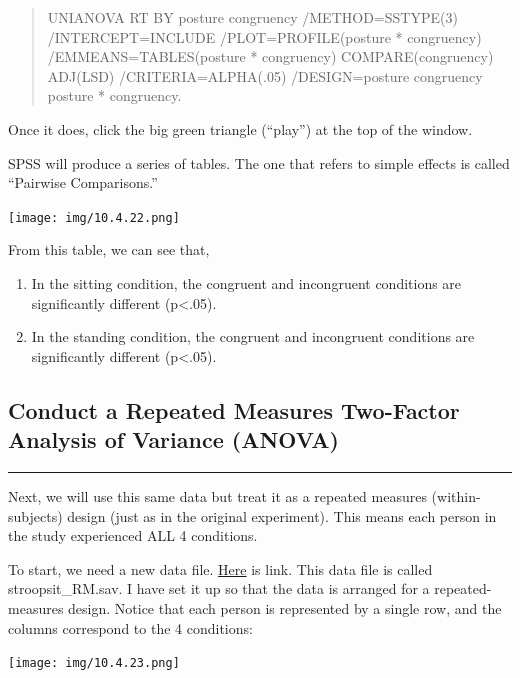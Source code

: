 \documentclass[
]{book}
\providecommand{\tightlist}{%
  \setlength{\itemsep}{0pt}\setlength{\parskip}{0pt}}
\begin{document}
\begin{quote}
UNIANOVA RT BY posture congruency
/METHOD=SSTYPE(3)
/INTERCEPT=INCLUDE
/PLOT=PROFILE(posture * congruency)
/EMMEANS=TABLES(posture * congruency) COMPARE(congruency) ADJ(LSD)
/CRITERIA=ALPHA(.05)
/DESIGN=posture congruency posture * congruency.
\end{quote}

Once it does, click the big green triangle (``{play}'') at the top of the window.

SPSS will produce a series of tables. The one that refers to simple effects is called ``Pairwise Comparisons.''

\texttt{[image: img/10.4.22.png]}

From this table, we can see that,

\begin{enumerate}
\def\labelenumi{\arabic{enumi}.}
\tightlist
\item
  In the sitting condition, the congruent and incongruent conditions are significantly different (p\textless.05).
\item
  In the standing condition, the congruent and incongruent conditions are significantly different (p\textless.05).
\end{enumerate}

\hypertarget{conduct-a-repeated-measures-two-factor-analysis-of-variance-anova}{%
\subsection{Conduct a Repeated Measures Two-Factor Analysis of Variance (ANOVA)}\label{conduct-a-repeated-measures-two-factor-analysis-of-variance-anova}}

\begin{center}\rule{0.5\linewidth}{0.5pt}\end{center}

Next, we will use this same data but treat it as a repeated measures (within-subjects) design (just as in the original experiment). This means each person in the study experienced ALL 4 conditions.

To start, we need a new data file. \href{https://github.com/CrumpLab/statisticsLab/blob/master/data/spssdata/stroopsit_RM.sav}{Here} is link. This data file is called stroopsit\_RM.sav. I have set it up so that the data is arranged for a repeated-measures design. Notice that each person is represented by a single row, and the columns correspond to the 4 conditions:

\texttt{[image: img/10.4.23.png]}
\end{document}
